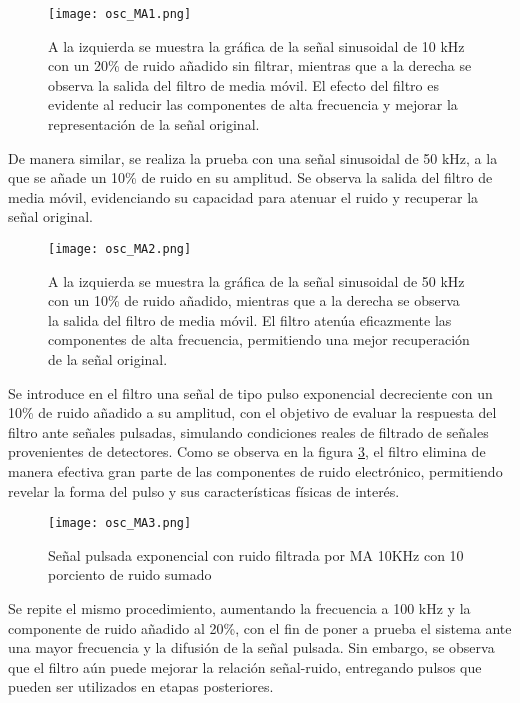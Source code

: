 \documentclass{report}
\begin{document}
\begin{figure}[H]
    \centering
    \texttt{[image: osc\_MA1.png]}
    \caption{A la izquierda se muestra la gráfica de la señal sinusoidal de 10 kHz con un 20\% de ruido añadido sin filtrar, mientras que a la derecha se observa la salida del filtro de media móvil. El efecto del filtro es evidente al reducir las componentes de alta frecuencia y mejorar la representación de la señal original.}
    \label{fig:signal1MADAQ}
\end{figure}

\noindent De manera similar, se realiza la prueba con una señal sinusoidal de 50 kHz, a la que se añade un 10\% de ruido en su amplitud. Se observa la salida del filtro de media móvil, evidenciando su capacidad para atenuar el ruido y recuperar la señal original.

\begin{figure}[H]
    \centering
    \texttt{[image: osc\_MA2.png]}
    \caption{A la izquierda se muestra la gráfica de la señal sinusoidal de 50 kHz con un 10\% de ruido añadido, mientras que a la derecha se observa la salida del filtro de media móvil. El filtro atenúa eficazmente las componentes de alta frecuencia, permitiendo una mejor recuperación de la señal original.}
    \label{fig:signal2MADAQ}
\end{figure}

\noindent Se introduce en el filtro una señal de tipo pulso exponencial decreciente con un 10\% de ruido añadido a su amplitud, con el objetivo de evaluar la respuesta del filtro ante señales pulsadas, simulando condiciones reales de filtrado de señales provenientes de detectores. Como se observa en la figura \ref{fig:signal3MADAQ}, el filtro elimina de manera efectiva gran parte de las componentes de ruido electrónico, permitiendo revelar la forma del pulso y sus características físicas de interés.

\begin{figure}[H]
    \centering
    \texttt{[image: osc\_MA3.png]}
    \caption{Señal pulsada exponencial con ruido filtrada por MA 10KHz con 10 porciento de ruido sumado}
    \label{fig:signal3MADAQ}
\end{figure}

\noindent Se repite el mismo procedimiento, aumentando la frecuencia a 100 kHz y la componente de ruido añadido al 20\%, con el fin de poner a prueba el sistema ante una mayor frecuencia y la difusión de la señal pulsada. Sin embargo, se observa que el filtro aún puede mejorar la relación señal-ruido, entregando pulsos que pueden ser utilizados en etapas posteriores.
\end{document}
